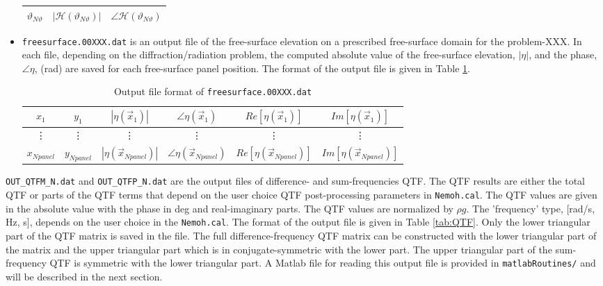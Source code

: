 \documentclass[12pt,a4paper,titlepage]{article}
\begin{document}
\begin{itemize}
\begin{table}[ht]
\begin{center}
\begin{tabular}{ccc}
$\vartheta_{N\vartheta}$ &$|\mathcal{H}(\vartheta_{N\vartheta})|$ & $\angle \mathcal{H}(\vartheta_{N\vartheta})$\\
\hline
\end{tabular}
\end{center}
\end{table}
    \item \texttt{freesurface.00XXX.dat} is an output file of the free-surface elevation on a prescribed free-surface domain for the problem-XXX. In each file, depending on the diffraction/radiation problem, the computed absolute value of the free-surface elevation, $|\eta|$, and the phase, $\angle \eta$, (rad) are saved for each free-surface panel position. The format of the output file is given in Table \ref{tab:freesurface}. 
\begin{table}[ht]
\begin{center}
\caption{Output file format of \texttt{freesurface.00XXX.dat}}\label{tab:freesurface}
\begin{tabular}{cccccc}
\hline
$x_1$ &$y_1$ &$|\eta(\vec{x}_1)|$ & $\angle \eta(\vec{x}_1)$ &$Re[ \eta(\vec{x}_1)]$ &$Im[ \eta(\vec{x}_1)]$\\
\hline
\vdots &\vdots &\vdots &\vdots &\vdots &\vdots
\\
\hline
$x_{Npanel}$ &$y_{Npanel}$ &$|\eta(\vec{x}_{Npanel})|$ & $\angle \eta(\vec{x}_{Npanel})$ &$Re[ \eta(\vec{x}_{Npanel})]$ &$Im[ \eta(\vec{x}_{Npanel})]$\\
\hline
\end{tabular}
\end{center}
\end{table}

\end{itemize}


\noindent
\texttt{OUT\_QTFM\_N.dat} and \texttt{OUT\_QTFP\_N.dat} are the output files of difference- and sum-frequencies QTF. The QTF results are either the total QTF or parts of the QTF terms that depend on the user choice QTF post-processing parameters in \texttt{Nemoh.cal}. The QTF values are given in the absolute value with the phase in deg and real-imaginary parts. The QTF values are normalized by $\rho g$. The 'frequency' type, [rad/s, Hz, s], depends on the user choice in the \texttt{Nemoh.cal}. The format of the output file is given in Table \ref{tab:QTF}. Only the lower triangular part of the QTF matrix is saved in the file. The full difference-frequency QTF matrix can be constructed with the lower triangular part of the matrix and the upper triangular part which is in conjugate-symmetric with the lower part. The upper triangular part of the sum-frequency QTF is symmetric with the lower triangular part.  A Matlab file for reading this output file is provided in \texttt{matlabRoutines/} and will be described in the next section.
\end{document}

